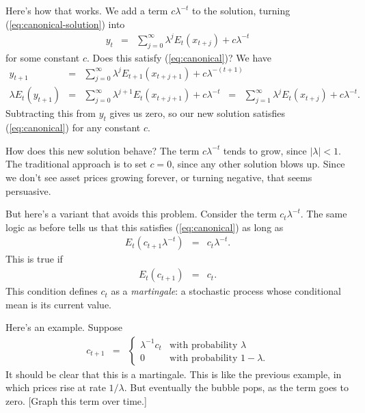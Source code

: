 \documentclass[11pt]{article}
\begin{document}
Here's how that works.
We add a term $c \lambda^{-t}$ to the solution, turning (\ref{eq:canonical-solution}) into
\begin{eqnarray*}
    y_t &=&  \sum_{j=0}^\infty \lambda^j E_t (x_{t+j}) + c \lambda^{-t}
\end{eqnarray*}
for some constant $c$.
Does this satisfy (\ref{eq:canonical})?
We have
\begin{eqnarray*}
    y_{t+1} &=& \sum_{j=0}^\infty \lambda^{j} E_{t+1} (x_{t+j+1}) + c \lambda^{-(t+1)} \\
    \lambda E_t(y_{t+1})
        &=& \sum_{j=0}^\infty \lambda^{j+1} E_t (x_{t+j+1}) + c \lambda^{-t}
        \;\;=\;\; \sum_{j=1}^\infty \lambda^{j} E_t (x_{t+j}) + c \lambda^{-t} .
\end{eqnarray*}
Subtracting this from $y_t$ gives us zero, so our new solution satisfies
(\ref{eq:canonical}) for any constant $c$.

How does this new solution behave?  The term $c \lambda^{-t}$ tends to grow,
since $ |\lambda| < 1$.  The traditional approach is to set $c=0$, since
any other solution blows up.
Since we don't see asset prices growing forever, or turning negative,
that seems persuasive.

But here's a variant that avoids this problem.
Consider the term $c_t \lambda^{-t}$.
The same logic as before tells us that this satisfies (\ref{eq:canonical})
as long as
\begin{eqnarray*}
    E_t (c_{t+1} \lambda^{-t}) &=& c_{t} \lambda^{-t} .
\end{eqnarray*}
This is true if
\begin{eqnarray*}
    E_t (c_{t+1}) &=& c_t .
\end{eqnarray*}
This condition defines $c_t$ as a {\it martingale\/}:  a stochastic process
whose conditional mean is its current value.

Here's an example.  Suppose
\begin{eqnarray*}
    c_{t+1} &=&
            \left\{
            \begin{array}{ll}
            \lambda^{-1} c_t & \mbox{with probability } \lambda \\
            0       &  \mbox{with probability } 1-\lambda .
            \end{array}
            \right.
\end{eqnarray*}
It should be clear that this is a martingale.
This is like the previous example, in which prices rise at rate $1/\lambda$.
But eventually the bubble pops, as the term goes to zero.
[Graph this term over time.]
\end{document}
